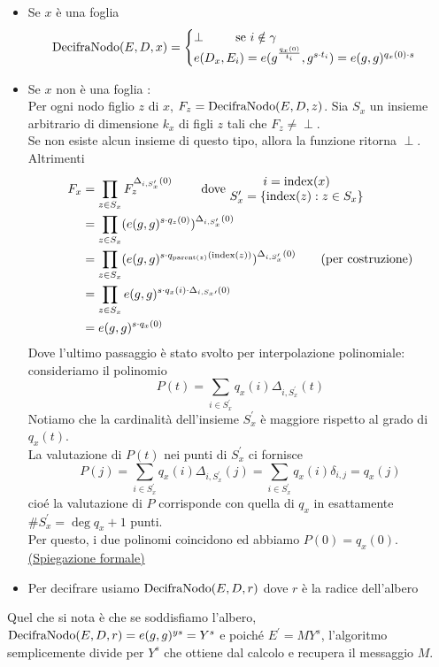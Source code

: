 \begin{description}
\begin{itemize}
\item Se $x$ è una foglia
\[ \operatorname{DecifraNodo}(E,D,x) = \begin{cases}
\perp \qquad \text{ se } i \notin \gamma\\
e(D_x,E_i) = e(g^{\frac{q_x(0)}{t_i}},g^{s\cdot t_i}) = e(g,g)^{q_x(0) \cdot s}
\end{cases} \]
\item Se $x$ non è una foglia :\\
Per ogni nodo figlio $z$ di $x$, $F_z = \operatorname{DecifraNodo}(E,D,z)$. Sia $S_x$\label{insiemedecript} un insieme arbitrario di dimensione $k_x$ di figli $z$ tali che $F_z \neq \perp$.\\
Se non esiste alcun insieme di questo tipo, allora la funzione ritorna $\perp$.\\
Altrimenti
\begin{align*}
F_x &= \prod_{z \in S_x} F_z^{\Delta_{i,S_x^\prime}(0)} \qquad \text{ dove }
\begin{matrix}
i = \operatorname{index}(x)\\
S^\prime_x = \{ \operatorname{index}(z) : z \in S_x \}
\end{matrix}\\
&= \prod_{z \in S_x} (e(g,g)^{s \cdot q_z(0)})^{\Delta_{i,S_x^\prime}(0)}\\
&= \prod_{z \in S_x} (e(g,g)^{s \cdot q_{\operatorname{parent}(z)}(\operatorname{index}(z))})^{\Delta_{i,S_x^\prime}(0)} \qquad \text{(per costruzione)}\\
&= \prod_{z \in S_x} e(g,g)^{s \cdot q_x(i) \cdot \Delta_{i,S_x\prime}(0)}\\
&= e(g,g)^{s \cdot q_x(0)} 
\end{align*}
Dove l'ultimo passaggio è stato svolto per interpolazione polinomiale:\\
consideriamo il polinomio
\[ P(t) = \sum_{i \in S^\prime_x} q_x(i) \Delta_{i,S^\prime_x}(t)\]
Notiamo che la cardinalità dell'insieme $ S^\prime_x$ è maggiore rispetto al grado di $q_x(t)$.\\
La valutazione di $P(t)$ nei punti di $S^\prime_x$ ci fornisce 
\[P(j) = \sum_{i \in S^\prime_x} q_x(i) \Delta_{i,S^\prime_x}(j) = \sum_{i \in S^\prime_x} q_x(i) \delta_{i,j} = q_x(j)\]
cioé la valutazione di $P$ corrisponde con quella di $q_x$ in esattamente $\# S^\prime_x = \deg q_x + 1$ punti.\\
Per questo, i due polinomi coincidono ed abbiamo $P(0) = q_x(0)$.	\href{http://math.stackexchange.com/questions/685472/find-n-degree-polynomial-from-n1-points}{(Spiegazione formale)}

\item Per decifrare usiamo $\operatorname{DecifraNodo} (E,D,r)$ dove $r$ è la radice dell'albero
\end{itemize}
Quel che si nota è che se soddisfiamo l'albero, $\operatorname{DecifraNodo} (E,D,r) = e(g,g)^{ys} = Y^s$ e poiché $E^\prime = MY^s$, l'algoritmo semplicemente divide per $Y^s$ che ottiene dal calcolo e recupera il messaggio $M$.
\end{description}


